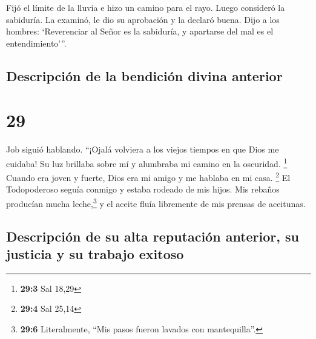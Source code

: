  Fijó el límite de la lluvia e hizo un camino para el
rayo.  Luego consideró la sabiduría. La examinó, le dio
su aprobación y la declaró buena.  Dijo a los hombres:
`Reverenciar al Señor es la sabiduría, y apartarse del mal es el
entendimiento'''.

\hypertarget{descripciuxf3n-de-la-bendiciuxf3n-divina-anterior}{%
\subsection{Descripción de la bendición divina
anterior}\label{descripciuxf3n-de-la-bendiciuxf3n-divina-anterior}}

\hypertarget{section-28}{%
\section{29}\label{section-28}}

 Job siguió hablando.  ``¡Ojalá volviera a
los viejos tiempos en que Dios me cuidaba!  Su luz
brillaba sobre mí y alumbraba mi camino en la oscuridad. \footnote{\textbf{29:3}
  Sal 18,29}  Cuando era joven y fuerte, Dios era mi amigo
y me hablaba en mi casa. \footnote{\textbf{29:4} Sal 25,14}
 El Todopoderoso seguía conmigo y estaba rodeado de mis
hijos.  Mis rebaños producían mucha leche,\footnote{\textbf{29:6}
  Literalmente, ``Mis pasos fueron lavados con mantequilla''.} y el
aceite fluía libremente de mis prensas de aceitunas.

\hypertarget{descripciuxf3n-de-su-alta-reputaciuxf3n-anterior-su-justicia-y-su-trabajo-exitoso}{%
\subsection{Descripción de su alta reputación anterior, su justicia y su
trabajo
exitoso}\label{descripciuxf3n-de-su-alta-reputaciuxf3n-anterior-su-justicia-y-su-trabajo-exitoso}}

